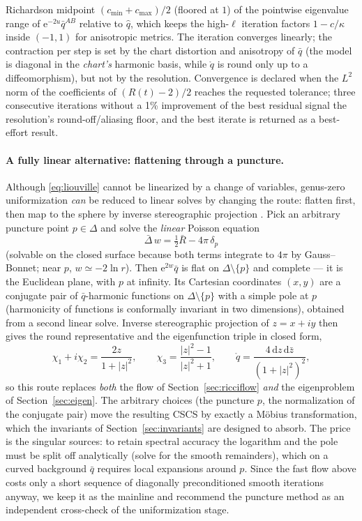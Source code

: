 \documentclass[11pt]{article}
\newcommand{\dd}{\mathrm{d}}
\newcommand{\ee}{\mathrm{e}}
\newcommand{\qo}{\mathring{q}}          %
\begin{document}
Richardson midpoint $(c_{\min}+c_{\max})/2$ (floored at $1$) of the
pointwise eigenvalue range of $\ee^{-2u}\bar q^{AB}$ relative to $\hat q$,
which keeps the high-$\ell$ iteration factors $1 - c/\kappa$ inside
$(-1,1)$ for anisotropic metrics.  The iteration converges linearly; the
contraction per step is set by the chart distortion and anisotropy of
$\bar q$ (the model is diagonal in the \emph{chart's} harmonic basis, while
$\qo$ is round only up to a diffeomorphism), but not by the resolution.
Convergence is declared when the $L^2$ norm of the coefficients of
$(R(t)-2)/2$ reaches the requested tolerance; three consecutive iterations
without a 1\% improvement of the best residual signal the resolution's
round-off/aliasing floor, and the best iterate is returned as a best-effort
result.

\paragraph{A fully linear alternative: flattening through a puncture.}
Although \eqref{eq:liouville} cannot be linearized by a change of variables,
genus-zero uniformization \emph{can} be reduced to linear solves by changing
the route: flatten first, then map to the sphere by inverse stereographic
projection \cite{haker2000}.  Pick an arbitrary puncture point
$p\in\Delta$ and solve the \emph{linear} Poisson equation
\begin{equation}
  \bar\Delta\, w = \tfrac12\bar R - 4\pi\,\delta_p
  \label{eq:puncture}
\end{equation}
(solvable on the closed surface because both terms integrate to $4\pi$ by
Gauss--Bonnet; near $p$, $w \simeq -2\ln r$).  Then $\ee^{2w}\bar q$ is flat
on $\Delta\setminus\{p\}$ and complete --- it is the Euclidean plane, with
$p$ at infinity.  Its Cartesian coordinates $(x,y)$ are a conjugate pair of
$\bar q$-harmonic functions on $\Delta\setminus\{p\}$ with a simple pole at
$p$ (harmonicity of functions is conformally invariant in two dimensions),
obtained from a second linear solve.  Inverse stereographic projection of
$z = x+iy$ then gives the round representative and the eigenfunction triple
in closed form,
\begin{equation}
  \chi_1 + i\chi_2 = \frac{2z}{1+|z|^2},
  \qquad
  \chi_3 = \frac{|z|^2-1}{|z|^2+1},
  \qquad
  \qo = \frac{4\,\dd z\,\dd\bar z}{(1+|z|^2)^2},
\end{equation}
so this route replaces \emph{both} the flow of
Section~\ref{sec:ricciflow} \emph{and} the eigenproblem of
Section~\ref{sec:eigen}.  The arbitrary choices (the puncture $p$, the
normalization of the conjugate pair) move the resulting CSCS by exactly a
M\"obius transformation, which the invariants of
Section~\ref{sec:invariants} are designed to absorb.  The price is the
singular sources: to retain spectral accuracy the logarithm and the pole
must be split off analytically (solve for the smooth remainders), which on
a curved background $\bar q$ requires local expansions around $p$.  Since
the fast flow above costs only a short sequence of diagonally preconditioned
smooth iterations anyway, we keep it as the mainline and recommend the
puncture method as an independent cross-check of the uniformization stage.
\end{document}
